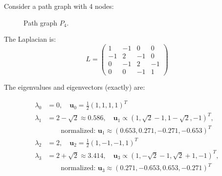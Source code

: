 \begin{notechapter}
Consider a path graph with 4 nodes:

\begin{figure}[H]
\centering
{}
\caption{Path graph $P_4$.}
\end{figure}

The Laplacian is:
\begin{equation}
L = \begin{pmatrix}
1 & -1 & 0 & 0 \\
-1 & 2 & -1 & 0 \\
0 & -1 & 2 & -1 \\
0 & 0 & -1 & 1
\end{pmatrix}
\end{equation}

The eigenvalues and eigenvectors (exactly) are:

\begin{align*}
\lambda_0 &= 0, \quad \mathbf{u}_0 = \frac{1}{2}(1, 1, 1, 1)^T \\
\lambda_1 &= 2 - \sqrt{2} \approx 0.586, \quad 
           \mathbf{u}_1 \propto (1, \sqrt{2}-1, 1-\sqrt{2}, -1)^T, \\ &\qquad\text{normalized: } \mathbf{u}_1 \approx (0.653, 0.271, -0.271, -0.653)^T \\
\lambda_2 &= 2, \quad \mathbf{u}_2 = \frac{1}{2}(1, -1, -1, 1)^T \\
\lambda_3 &= 2 + \sqrt{2} \approx 3.414, \quad 
           \mathbf{u}_3 \propto (1, -\sqrt{2}-1, \sqrt{2}+1, -1)^T, \\ &\qquad\text{normalized: } \mathbf{u}_3 \approx (0.271, -0.653, 0.653, -0.271)^T
\end{align*}

\begin{figure}[H]
\centering
{}
\end{figure}
\end{notechapter}
